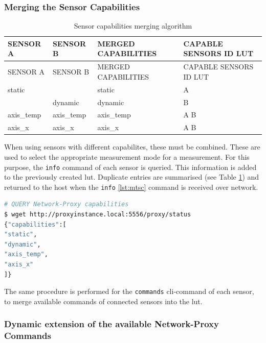 \hypertarget{merging-the-sensor-capabilities}{%
\subsubsection{Merging the Sensor
Capabilities}\label{merging-the-sensor-capabilities}}

\begin{longtable}[]{@{}llll@{}}
\caption{Sensor capabilities merging algorithm
\label{Sensor_capabilities_merging_algorithm.csv}}\tabularnewline
\toprule
SENSOR A & SENSOR B & MERGED CAPABILITIES & CAPABLE SENSORS ID
LUT\tabularnewline
\midrule
\endfirsthead
\toprule
SENSOR A & SENSOR B & MERGED CAPABILITIES & CAPABLE SENSORS ID
LUT\tabularnewline
\midrule
\endhead
static & & static & A\tabularnewline
& dynamic & dynamic & B\tabularnewline
axis\_temp & axis\_temp & axis\_temp & A B\tabularnewline
axis\_x & axis\_x & axis\_x & A B\tabularnewline
\bottomrule
\end{longtable}

When using sensors with different capabilites, these must be combined.
These are used to select the appropriate measurement mode for a
measurement. For this purpose, the \passthrough{\lstinline!info!}
command of each sensor is queried. This information is added to the
previously created \gls{lut}. Duplicate entries are summarised (see
Table \ref{Sensor_capabilities_merging_algorithm.csv}) and returned to
the host when the \passthrough{\lstinline!info!} \ref{lst:mtsc} command
is received over network.

\begin{lstlisting}[language=bash, caption={MRPproxy REST enpoiint query examples}, label=lst:mtsc]
# QUERY Network-Proxy capabilities
$ wget http://proxyinstance.local:5556/proxy/status
{"capabilities":[
"static",
"dynamic",
"axis_temp",
"axis_x"
]}
\end{lstlisting}

The same procedure is performed for the
\passthrough{\lstinline!commands!} \gls{cli}-command of each sensor, to
merge available commands of connected sensors into the \gls{lut}.

\hypertarget{dynamic-extension-of-the-available-network-proxy-commands}{%
\subsubsection{Dynamic extension of the available Network-Proxy
Commands}\label{dynamic-extension-of-the-available-network-proxy-commands}}

